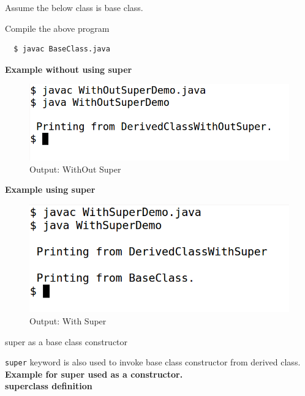 \documentclass[11pt,a4paper]{article}
\begin{document}
 Assume the below class is base class.
 
  
 \begin{description}
  \item Compile the above program
  \begin{verbatim}
  $ javac BaseClass.java
 \end{verbatim}
 \textbf{Example without using super} 
 
 
 \begin{figure}[H] 
 \begin{center}
   \includegraphics[scale=.4]{WithOutSuperDemo.png}
   \caption*{Output: WithOut Super}
 \end{center}
 \end{figure}
 \textbf{Example using super} 
 
 \begin{figure}[H] 
 \begin{center}
   \includegraphics[scale=.4]{WithSuperDemo.png}
   \caption*{Output: With Super}
 \end{center}
 \end{figure}
 

super as a base class constructor
 
 \lstinline!super! keyword is also used to invoke base class constructor from derived class.\\
 
 \textbf{Example for super used as a constructor.} \\
 \textbf{superclass definition}
 

\end{description}
\end{document}
